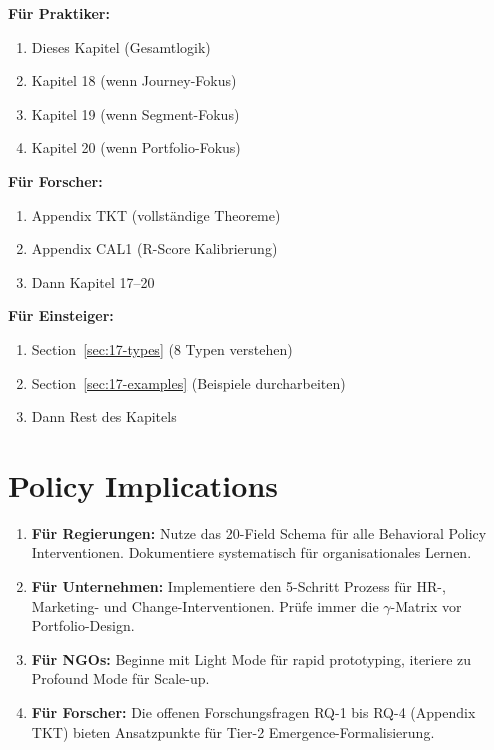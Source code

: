 \begin{tcolorbox}[colback=gray!5!white, colframe=gray!75!black,
    title=Empfohlene Lesepfade]

\textbf{Für Praktiker:}
\begin{enumerate}[nosep]
\item Dieses Kapitel (Gesamtlogik)
\item Kapitel 18 (wenn Journey-Fokus)
\item Kapitel 19 (wenn Segment-Fokus)
\item Kapitel 20 (wenn Portfolio-Fokus)
\end{enumerate}

\textbf{Für Forscher:}
\begin{enumerate}[nosep]
\item Appendix TKT (vollständige Theoreme)
\item Appendix CAL1 (R-Score Kalibrierung)
\item Dann Kapitel 17--20
\end{enumerate}

\textbf{Für Einsteiger:}
\begin{enumerate}[nosep]
\item Section~\ref{sec:17-types} (8 Typen verstehen)
\item Section~\ref{sec:17-examples} (Beispiele durcharbeiten)
\item Dann Rest des Kapitels
\end{enumerate}

\end{tcolorbox}



\section*{Policy Implications}

\begin{enumerate}
\item \textbf{Für Regierungen:} Nutze das 20-Field Schema für alle Behavioral Policy Interventionen. Dokumentiere systematisch für organisationales Lernen.

\item \textbf{Für Unternehmen:} Implementiere den 5-Schritt Prozess für HR-, Marketing- und Change-Interventionen. Prüfe immer die $\gamma$-Matrix vor Portfolio-Design.

\item \textbf{Für NGOs:} Beginne mit Light Mode für rapid prototyping, iteriere zu Profound Mode für Scale-up.

\item \textbf{Für Forscher:} Die offenen Forschungsfragen RQ-1 bis RQ-4 (Appendix TKT) bieten Ansatzpunkte für Tier-2 Emergence-Formalisierung.
\end{enumerate}


